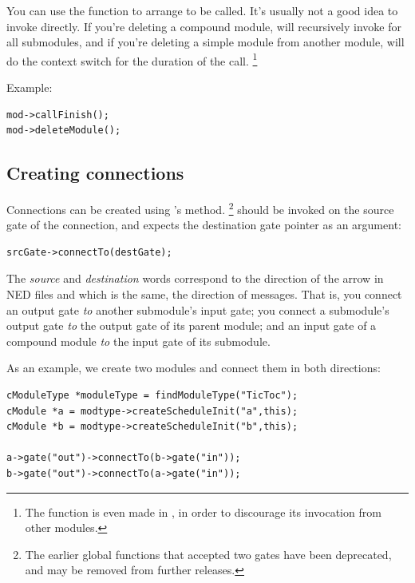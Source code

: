 You can use the  function to arrange 
to be called. It's usually not a good idea to invoke 
directly. If you're deleting a compound module,  will
recursively invoke  for all submodules, and if you're deleting
a simple module from another module,  will do the context
switch for the duration of the call.
  \footnote{The  function is even made 
  in , in order to discourage its invocation from
  other modules.}

Example:

\begin{verbatim}
mod->callFinish();
mod->deleteModule();
\end{verbatim}


\subsection{Creating connections}

Connections can be created using 's 
method.
  \footnote{The earlier  global functions that
  accepted two gates have been deprecated, and may be removed
  from further {\opp} releases.}
 should be invoked on the source gate
of the connection, and expects the destination gate pointer as
an argument:

\begin{verbatim}
srcGate->connectTo(destGate);
\end{verbatim}

The \textit{source} and \textit{destination} words correspond
to the direction of the arrow in NED files and which is the same,
the direction of messages. That is,
you connect an output gate \textit{to} another submodule's input gate;
you connect a submodule's output gate \textit{to} the output gate
of its parent module; and an input gate of a compound module
\textit{to} the input gate of its submodule.

As an example, we create two modules and connect them in both directions:

\begin{verbatim}
cModuleType *moduleType = findModuleType("TicToc");
cModule *a = modtype->createScheduleInit("a",this);
cModule *b = modtype->createScheduleInit("b",this);

a->gate("out")->connectTo(b->gate("in"));
b->gate("out")->connectTo(a->gate("in"));
\end{verbatim}

